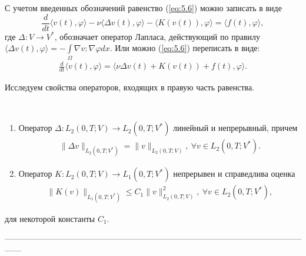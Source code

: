 С учетом введенных обозначений равенство (\ref{eq:5.6}) можно записать в виде
$$\frac{d}{dt} \langle v(t),\varphi \rangle - \nu\langle \Delta v(t), \varphi \rangle -
\langle K(v(t)),\varphi \rangle = \langle f(t),\varphi \rangle,$$
где $\Delta: V \rightarrow V^\ast$, обозначает оператор Лапласа, действующий по правилу
$\langle \Delta v(t),\varphi \rangle=-\int\limits_\Omega \nabla v:\nabla\varphi dx.$
Или можно (\ref{eq:5.6}) переписать в виде:
\begin{equation}\label{eq:5.8}
    \begin{gathered}
        \frac{d}{dt} \langle v(t),\varphi \rangle = \langle \nu\Delta v(t)+K(v(t))+f(t),\varphi \rangle.
    \end{gathered}
\end{equation}

Исследуем свойства операторов, входящих в правую часть равенства.
\begin{lemma} ~\\
    \begin{enumerate}
        \item Оператор $\Delta: L_2(0, T; V) \rightarrow L_2(0, T; V^\ast)$ линейный и\linebreak
        непрерывный, причем
        \begin{equation}\label{eq:5.9}
            \begin{gathered}
                \| \Delta v \|_{L_2(0, T; V^\ast)} = \| v \|_{L_2(0, T; V)}, \ \forall v \in L_2(0, T; V^\ast).
            \end{gathered}
        \end{equation}
        \item Оператор $K: L_2(0, T; V) \rightarrow L_1(0, T; V^\ast)$ непрерывен и справедлива оценка
        \begin{equation}\label{eq:5.10}
            \begin{gathered}
                \| K(v) \|_{L_1(0, T; V^\ast)} \leqslant C_1\| v \|^2_{L_2(0, T;V)}, \ \forall v \in L_2(0, T; V^\ast),
            \end{gathered}
        \end{equation}
    \end{enumerate}
    для некоторой константы $C_1$.
\end{lemma}
------------------------------------------------------------------------------------------------------------------
